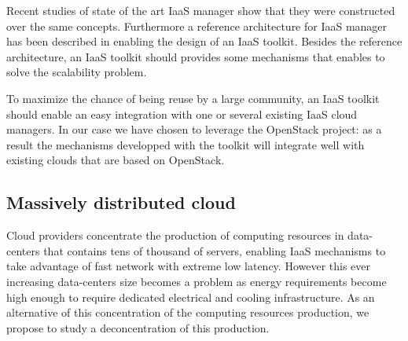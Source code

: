 Recent studies of state of the art IaaS manager \cite{peng:2009} show that they
were constructed over the same concepts. Furthermore a reference architecture 
for IaaS manager has been described in \cite{moreno2012iaas} enabling the design
of an IaaS toolkit. Besides the reference architecture, an IaaS toolkit should
provides some mechanisms that enables to solve the scalability problem.

To maximize the chance of being reuse by a large community, an IaaS toolkit 
should enable an easy integration with one or several existing IaaS cloud
managers. In our case we have chosen to leverage the OpenStack project: as a 
result the mechanisms developped with the toolkit will integrate well with 
existing clouds that are based on OpenStack.



\subsection{Massively distributed cloud}









Cloud providers concentrate the production of computing resources in 
data-centers that contains tens of thousand of servers, enabling IaaS mechanisms
to take advantage of fast network with extreme low latency. However this ever 
increasing data-centers size becomes a problem as energy requirements become
high enough to require dedicated electrical and cooling infrastructure. As 
an alternative of this concentration of the computing resources production, we 
propose to study a deconcentration of this production.

